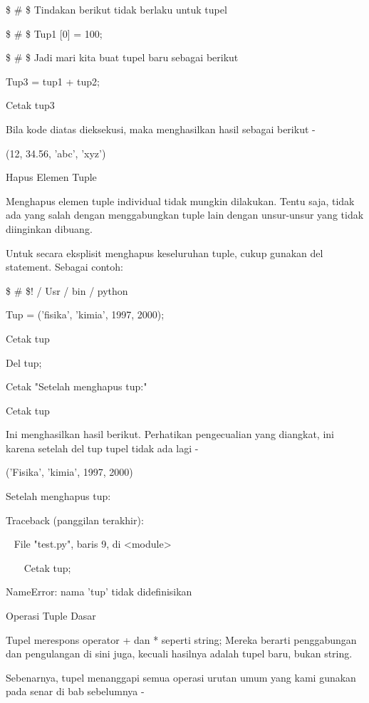 \vspace{12pt}
 \$  \# \$ Tindakan berikut tidak berlaku untuk tupel \par
 \$  \#  \$ Tup1 [0] = 100; \par
\vspace{12pt}
 \$  \#  \$ Jadi mari kita buat tupel baru sebagai berikut \par
Tup3 = tup1 + tup2; \par
Cetak tup3 \par
Bila kode diatas dieksekusi, maka menghasilkan hasil sebagai berikut - \par
(12, 34.56, 'abc', 'xyz') \par
Hapus Elemen Tuple \par
Menghapus elemen tuple individual tidak mungkin dilakukan. Tentu saja, tidak ada yang salah dengan menggabungkan tuple lain dengan unsur-unsur yang tidak diinginkan dibuang. \par
Untuk secara eksplisit menghapus keseluruhan tuple, cukup gunakan del statement. Sebagai contoh: \par
 \$  \#  \$! / Usr / bin / python \par
\vspace{12pt}
Tup = ('fisika', 'kimia', 1997, 2000); \par
\vspace{12pt}
Cetak tup \par
Del tup; \par
Cetak "Setelah menghapus tup:" \par
Cetak tup \par
Ini menghasilkan hasil berikut. Perhatikan pengecualian yang diangkat, ini karena setelah del tup tupel tidak ada lagi - \par
('Fisika', 'kimia', 1997, 2000) \par
Setelah menghapus tup: \par
Traceback (panggilan terakhir): \par
~ File "test.py", baris 9, di <module> \par
~~~ Cetak tup; \par
NameError: nama 'tup' tidak didefinisikan \par
Operasi Tuple Dasar \par
Tupel merespons operator + dan * seperti string; Mereka berarti penggabungan dan pengulangan di sini juga, kecuali hasilnya adalah tupel baru, bukan string. \par
Sebenarnya, tupel menanggapi semua operasi urutan umum yang kami gunakan pada senar di bab sebelumnya - \par
